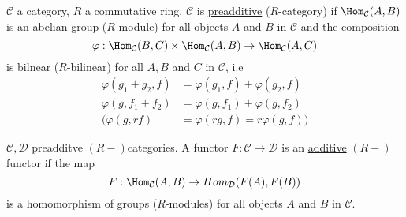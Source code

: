 
\begin{defin}
$\mathcal{C}$ a category, $R$ a commutative ring. $\mathcal{C}$ is \underline{preadditive} ($R$-category) if $\Hom_\mathcal{C}(A,B)$ is an abelian group ($R$-module) for all objects $A$ and $B$ in $\mathcal{C}$ and the composition \[ \varphi: \Hom_\mathcal{C}(B,C) \times \Hom_\mathcal{C}(A,B) \to \Hom_\mathcal{C}(A,C) \] is bilnear ($R$-bilinear) for all $A,B$ and $C$ in $\mathcal{C}$, i.e
\begin{equation*}
\begin{split}
\varphi(g_1 + g_2, f) &= \varphi(g_1,f) + \varphi(g_2, f)\\
\varphi(g, f_1 + f_2) &= \varphi(g, f_1) + \varphi(g, f_2)\\
\Big(\varphi(g, rf) &= \varphi(rg, f) = r\varphi(g,f)\Big)
\end{split}
\end{equation*}
\end{defin}

\begin{defin}
$\mathcal{C}, \mathcal{D}$ preadditve $(R-)$categories. A functor $F: \mathcal{C} \to \mathcal{D}$ is an \underline{additive} $(R-)$functor if the map \[ F: \Hom_\mathcal{C}(A, B) \to Hom_\mathcal{D}(F(A), F(B))\] is a homomorphism of groups ($R$-modules) for all objects $A$ and $B$ in $\mathcal{C}$.
\end{defin}


